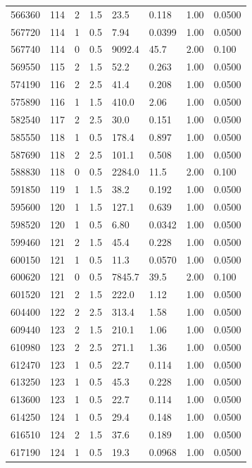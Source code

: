 \documentclass[preview]{standalone}
\begin{document}
{{{{{{{{{\begin{tabular}{L{1.2cm}C{1.2cm} C{0.3cm}C{0.5cm} C{1.4cm}C{1.4cm} C{1.4cm}C{1.4cm}}
  566360  &   114  & 2     & 1.5 &  23.5  & 0.118  & 1.00 &  0.0500   \\ 
  567720  &   114  & 1     & 0.5 &  7.94  & 0.0399  & 1.00 &  0.0500   \\ 
  567740  &   114  & 0     & 0.5 &  9092.4  & 45.7  & 2.00 &  0.100   \\ 
  569550  &   115  & 2     & 1.5 &  52.2  & 0.263  & 1.00 &  0.0500   \\ 
  574190  &   116  & 2     & 2.5 &  41.4  & 0.208  & 1.00 &  0.0500   \\ 
  575890  &   116  & 1     & 1.5 &  410.0  & 2.06  & 1.00 &  0.0500   \\ 
  582540  &   117  & 2     & 2.5 &  30.0  & 0.151  & 1.00 &  0.0500   \\ 
  585550  &   118  & 1     & 0.5 &  178.4  & 0.897  & 1.00 &  0.0500   \\ 
  587690  &   118  & 2     & 2.5 &  101.1  & 0.508  & 1.00 &  0.0500   \\ 
  588830  &   118  & 0     & 0.5 &  2284.0  & 11.5  & 2.00 &  0.100   \\ 
  591850  &   119  & 1     & 1.5 &  38.2  & 0.192  & 1.00 &  0.0500   \\ 
  595600  &   120  & 1     & 1.5 &  127.1  & 0.639  & 1.00 &  0.0500   \\ 
  598520  &   120  & 1     & 0.5 &  6.80  & 0.0342  & 1.00 &  0.0500   \\ 
  599460  &   121  & 2     & 1.5 &  45.4  & 0.228  & 1.00 &  0.0500   \\ 
  600150  &   121  & 1     & 0.5 &  11.3  & 0.0570  & 1.00 &  0.0500   \\ 
  600620  &   121  & 0     & 0.5 &  7845.7  & 39.5  & 2.00 &  0.100   \\ 
  601520  &   121  & 2     & 1.5 &  222.0  & 1.12  & 1.00 &  0.0500   \\ 
  604400  &   122  & 2     & 2.5 &  313.4  & 1.58  & 1.00 &  0.0500   \\ 
  609440  &   123  & 2     & 1.5 &  210.1  & 1.06  & 1.00 &  0.0500   \\ 
  610980  &   123  & 2     & 2.5 &  271.1  & 1.36  & 1.00 &  0.0500   \\ 
  612470  &   123  & 1     & 0.5 &  22.7  & 0.114  & 1.00 &  0.0500   \\ 
  613250  &   123  & 1     & 0.5 &  45.3  & 0.228  & 1.00 &  0.0500   \\ 
  613600  &   123  & 1     & 0.5 &  22.7  & 0.114  & 1.00 &  0.0500   \\ 
  614250  &   124  & 1     & 0.5 &  29.4  & 0.148  & 1.00 &  0.0500   \\ 
  616510  &   124  & 2     & 1.5 &  37.6  & 0.189  & 1.00 &  0.0500   \\ 
  617190  &   124  & 1     & 0.5 &  19.3  & 0.0968  & 1.00 &  0.0500   \\ 
\hline 
\end{tabular} 

}}}}}}}}}
\end{document}
